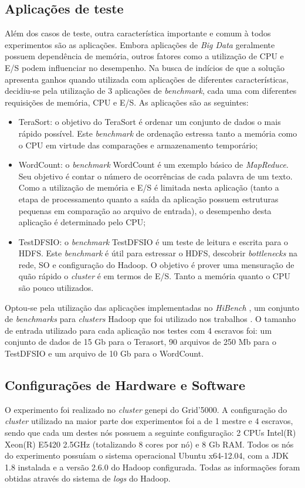 \subsection{Aplicações de teste}
Além dos casos de teste, outra característica importante e comum à todos experimentos são as aplicações. Embora aplicações de \textit{Big Data} geralmente possuem dependência de memória, outros fatores como a utilização de CPU e E/S podem influenciar no desempenho. Na busca de indícios de que a solução apresenta ganhos quando utilizada com aplicações de diferentes características, decidiu-se pela utilização de 3 aplicações de \textit{benchmark}, cada uma com diferentes requisições de memória, CPU e E/S. As aplicações são as seguintes:

\begin{itemize}
	\item TeraSort: o objetivo do TeraSort \citep{TeraSort2008} é ordenar um conjunto de dados o mais rápido possível. Este \textit{benchmark} de ordenação estressa tanto a memória como o CPU em virtude das comparações e armazenamento temporário;
	\item WordCount: o \textit{benchmark} WordCount é um exemplo básico de \textit{MapReduce}. Seu objetivo é contar o número de ocorrências de cada palavra de um texto. Como a utilização de memória e E/S é limitada nesta aplicação (tanto a etapa de processamento quanto a saída da aplicação possuem estruturas pequenas em comparação ao arquivo de entrada), o desempenho desta aplicação é determinado pelo CPU;
	\item TestDFSIO: o \textit{benchmark} TestDFSIO é um teste de leitura e escrita para o HDFS. Este \textit{benchmark} é útil para estressar o HDFS, descobrir \textit{bottlenecks} na rede, SO e configuração do Hadoop. O objetivo é prover uma mensuração de quão rápido o \textit{cluster} é em termos de E/S. Tanto a memória quanto o CPU são pouco utilizados.
\end{itemize}

Optou-se pela utilização das aplicações implementadas no \textit{HiBench} \cite{HiBench}, um conjunto de \textit{benchmarks} para \textit{clusters} Hadoop que foi utilizado nos trabalhos \cite{HBA} \cite{HBB} \cite{HBC}. O tamanho de entrada utilizado para cada aplicação nos testes com 4 escravos foi: um conjunto de dados de 15 Gb para o Terasort, 90 arquivos de 250 Mb para o TestDFSIO e um arquivo de 10 Gb para o WordCount. 

\subsection{Configurações de Hardware e Software}
O experimento foi realizado no \textit{cluster} genepi do Grid'5000. A configuração do \textit{cluster} utilizado na maior parte dos experimentos foi a de 1 mestre e 4 escravos, sendo que cada um destes nós possuem a seguinte configuração: 2 CPUs Intel(R) Xeon(R) E5420 2.5GHz (totalizando 8 cores por nó) e 8 Gb RAM. Todos os nós do experimento possuíam o sistema operacional Ubuntu x64-12.04, com a JDK 1.8 instalada e a versão 2.6.0 do Hadoop configurada. Todas as informações foram obtidas através do sistema de \textit{logs} do Hadoop.

